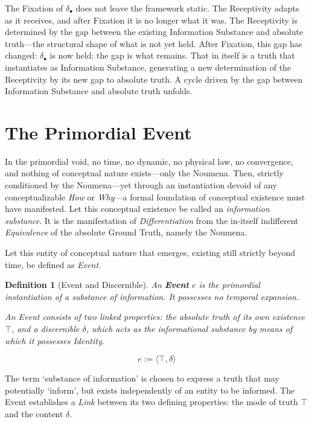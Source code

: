 \documentclass[11pt, a4paper]{article}
\theoremstyle{formalism}
\newtheorem{formalism}{Definition}
\begin{document}
The Fixation of $\delta_\bullet$ does not leave the framework static. The
Receptivity adapts as it receives, and after Fixation it is no longer what
it was. The Receptivity is determined by the gap between the existing
Information Substance and absolute truth---the structural shape of what is
not yet held. After Fixation, this gap has changed: $\delta_\bullet$ is now
held; the gap is what remains. That in itself is a truth that instantiates
as Information Substance, generating a new determination of the Receptivity
by its new gap to absolute truth. A cycle driven by the gap between
Information Substance and absolute truth unfolds.

\section{The Primordial Event}

In the primordial void, no time, no dynamic, no physical law, no convergence,
and nothing of conceptual nature exists---only the Noumena. Then, strictly
conditioned by the Noumena---yet through an instantiation devoid of any
conceptualizable \textit{How} or \textit{Why}---a formal foundation of
conceptual existence must have manifested. Let this conceptual existence
be called an \textit{information substance}. It is the manifestation 
of \textit{Differentiation} from the in-itself indifferent \textit{Equivalence} 
of the absolute Ground Truth, namely the Noumena.

Let this entity of conceptual nature that emerges, existing still strictly
beyond time, be defined as \textit{Event}.

\begin{formalism}[Event and Discernible]

    An \textbf{Event} $e$ is the primordial instantiation of a substance of
    information. It possesses no temporal expansion. 

    An Event consists of two linked properties: the absolute truth of its own
    existence $\top$, and a \textit{discernible} $\delta$, which acts as the
    informational substance by means of which it possesses \textit{Identity}.

    \begin{equation}
        e := \langle \top, \delta \rangle
    \end{equation}

\end{formalism}

The term `substance of information' is chosen to express a truth that may
potentially `inform', but exists independently of an entity to be informed.
The Event establishes a \textit{Link} between its two defining properties:
the mode of truth $\top$ and the content $\delta$.
\end{document}
